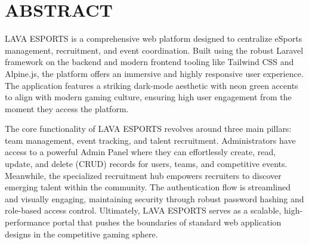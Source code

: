 \chapter*{\centering \LARGE ABSTRACT}  
\vspace{-1cm}  


 LAVA ESPORTS is a comprehensive web platform designed to centralize eSports management, recruitment, and event coordination. Built using the robust Laravel framework on the backend and modern frontend tooling like Tailwind CSS and Alpine.js, the platform offers an immersive and highly responsive user experience. The application features a striking dark-mode aesthetic with neon green accents to align with modern gaming culture, ensuring high user engagement from the moment they access the platform.

The core functionality of LAVA ESPORTS revolves around three main pillars: team management, event tracking, and talent recruitment. Administrators have access to a powerful Admin Panel where they can effortlessly create, read, update, and delete (CRUD) records for users, teams, and competitive events. Meanwhile, the specialized recruitment hub empowers recruiters to discover emerging talent within the community. The authentication flow is streamlined and visually engaging, maintaining security through robust password hashing and role-based access control. Ultimately, LAVA ESPORTS serves as a scalable, high-performance portal that pushes the boundaries of standard web application designs in the competitive gaming sphere.


